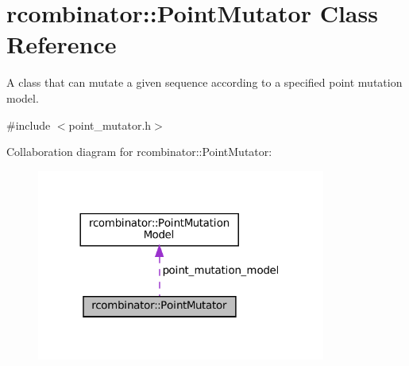 \hypertarget{classrcombinator_1_1PointMutator}{}\section{rcombinator\+:\+:Point\+Mutator Class Reference}
\label{classrcombinator_1_1PointMutator}


A class that can mutate a given sequence according to a specified point mutation model.  




{\ttfamily \#include $<$point\+\_\+mutator.\+h$>$}



Collaboration diagram for rcombinator\+:\+:Point\+Mutator\+:\nopagebreak
\begin{figure}[H]
\begin{center}
\leavevmode
\includegraphics[width=269pt]{classrcombinator_1_1PointMutator__coll__graph}
\end{center}
\end{figure}
